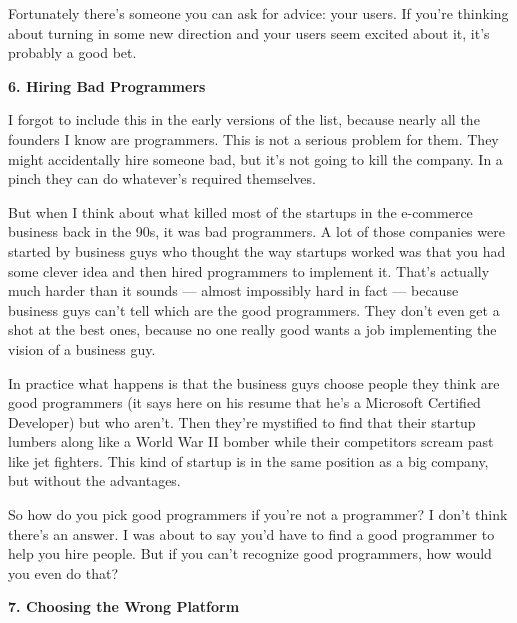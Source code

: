 Fortunately
                    there's someone you can ask for advice: your users. If
                    you're thinking about turning in some new direction and your
                    users seem excited about it, it's probably a good bet.

\textbf{6. Hiring Bad Programmers}

I forgot to include this in the early versions
                    of the list, because nearly all the founders I know are
                    programmers. This is not a serious problem for them. They
                    might accidentally hire someone bad, but it's not going to
                    kill the company. In a pinch they can do whatever's required
                    themselves.

But when I think about what killed
                    most of the startups in the e-commerce business back in the
                    90s, it was bad programmers. A lot of those companies were
                    started by business guys who thought the way startups worked
                    was that you had some clever idea and then hired programmers
                    to implement it. That's actually much harder than it sounds
                    --- almost impossibly hard in fact --- because
                    business guys can't tell which are the good programmers.
                    They don't even get a shot at the best ones, because no one
                    really good wants a job implementing the vision of a
                    business guy.

In practice what happens is that
                    the business guys choose people they think are good
                    programmers (it says here on his resume that he's a
                    Microsoft Certified Developer) but who aren't. Then they're
                    mystified to find that their startup lumbers along like a
                    World War II bomber while their competitors scream past like
                    jet fighters. This kind of startup is in the same position
                    as a big company, but without the advantages.

So
                    how do you pick good programmers if you're not a programmer?
                    I don't think there's an answer. I was about to say you'd
                    have to find a good programmer to help you hire people. But
                    if you can't recognize good programmers, how would you even
                    do that?

\textbf{7. Choosing the Wrong Platform}


